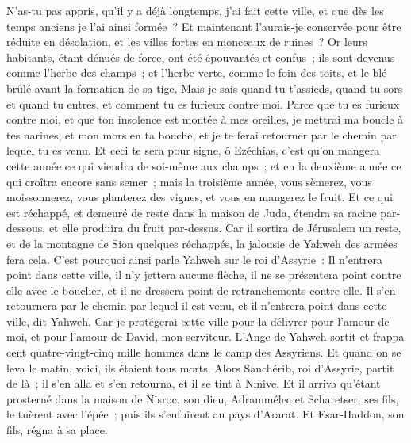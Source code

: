 \begin{multicols}{2}
N'as-tu pas appris, qu'il y a déjà longtemps, j'ai fait cette ville, et que dès les temps anciens je l'ai ainsi formée~? Et maintenant l'aurais-je conservée pour être réduite en désolation, et les villes fortes en monceaux de ruines~?
Or leurs habitants, étant dénués de force, ont été épouvantés et confus~; ils sont devenus comme l'herbe des champs~; et l'herbe verte, comme le foin des toits, et le blé brûlé avant la formation de sa tige.
Mais je sais quand tu t'assieds, quand tu sors et quand tu entres, et comment tu es furieux contre moi.
Parce que tu es furieux contre moi, et que ton insolence est montée à mes oreilles, je mettrai ma boucle à tes narines, et mon mors en ta bouche, et je te ferai retourner par le chemin par lequel tu es venu.
Et ceci te sera pour signe, ô Ezéchias, c'est qu'on mangera cette année ce qui viendra de soi-même aux champs~; et en la deuxième année ce qui croîtra encore sans semer~; mais la troisième année, vous sèmerez, vous moissonnerez, vous planterez des vignes, et vous en mangerez le fruit.
Et ce qui est réchappé, et demeuré de reste dans la maison de Juda, étendra sa racine par-dessous, et elle produira du fruit par-dessus.
Car il sortira de Jérusalem un reste, et de la montagne de Sion quelques réchappés, la jalousie de Yahweh des armées fera cela.
C'est pourquoi ainsi parle Yahweh sur le roi d'Assyrie~: Il n'entrera point dans cette ville, il n'y jettera aucune flèche, il ne se présentera point contre elle avec le bouclier, et il ne dressera point de retranchements contre elle.
Il s'en retournera par le chemin par lequel il est venu, et il n'entrera point dans cette ville, dit Yahweh.
Car je protégerai cette ville pour la délivrer pour l'amour de moi, et pour l'amour de David, mon serviteur.
L'Ange de Yahweh sortit et frappa cent quatre-vingt-cinq mille hommes dans le camp des Assyriens. Et quand on se leva le matin, voici, ils étaient tous morts.
Alors Sanchérib, roi d'Assyrie, partit de là~; il s'en alla et s'en retourna, et il se tint à Ninive.
Et il arriva qu'étant prosterné dans la maison de Nisroc, son dieu, Adrammélec et Scharetser, ses fils, le tuèrent avec l'épée~; puis ils s'enfuirent au pays d'Ararat. Et Esar-Haddon, son fils, régna à sa place.

\end{multicols}
